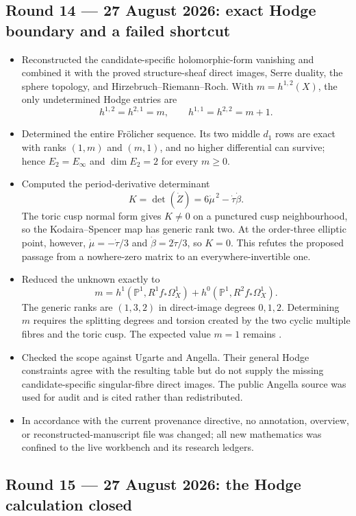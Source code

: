 \subsection*{Round 14 --- 27 August 2026: exact Hodge boundary and a failed shortcut}

\begin{itemize}[leftmargin=1.8em]
\item Reconstructed the candidate-specific holomorphic-form vanishing and
combined it with the proved structure-sheaf direct images, Serre duality,
the sphere topology, and Hirzebruch--Riemann--Roch.  With
$m=h^{1,2}(X)$, the only undetermined Hodge entries are
\[
h^{1,2}=h^{2,1}=m,\qquad h^{1,1}=h^{2,2}=m+1.
\]
\item Determined the entire Fr\"olicher sequence.  Its two middle $d_1$ rows
are exact with ranks $(1,m)$ and $(m,1)$, and no higher differential can
survive; hence $E_2=E_\infty$ and $\dim E_2=2$ for every $m\geq0$.
\item Computed the period-derivative determinant
\[
K=\det(\dot Z)=6\dot\mu^{\,2}-\dot\tau\dot\beta.
\]
The toric cusp normal form gives $K\neq0$ on a punctured cusp neighbourhood,
so the Kodaira--Spencer map has generic rank two.  At the order-three
elliptic point, however,
$\dot\mu=-\dot\tau/3$ and $\dot\beta=2\dot\tau/3$, so $K=0$.  This refutes
the proposed passage from a nowhere-zero matrix to an everywhere-invertible
one.
\item Reduced the unknown exactly to
\[
m=h^1(\mathbb P^1,R^1f_*\Omega_X^1)
  +h^0(\mathbb P^1,R^2f_*\Omega_X^1).
\]
The generic ranks are $(1,3,2)$ in direct-image degrees $0,1,2$.  Determining
$m$ requires the splitting degrees and torsion created by the two cyclic
multiple fibres and the toric cusp.  The expected value $m=1$ remains
\Open.
\item Checked the scope against Ugarte and Angella.  Their general Hodge
constraints agree with the resulting table but do not supply the missing
candidate-specific singular-fibre direct images.  The public Angella source
was used for audit and is cited rather than redistributed.
\item In accordance with the current provenance directive, no annotation,
overview, or reconstructed-manuscript file was changed; all new mathematics
was confined to the live workbench and its research ledgers.
\end{itemize}

\subsection*{Round 15 --- 27 August 2026: the Hodge calculation closed}

